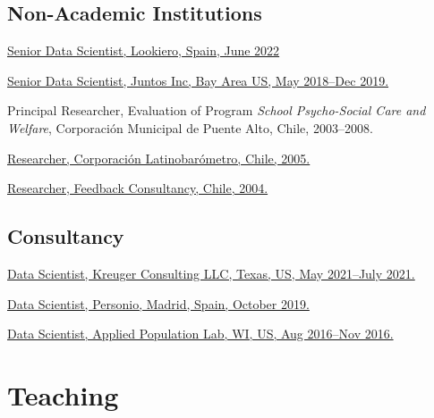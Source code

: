 \documentclass[10pt,letterpaper]{article}
\renewenvironment{itemize}{
  \begin{list}{}{
    \setlength{\leftmargin}{1.5em}
    \setlength{\itemsep}{0.25em}
    \setlength{\parskip}{0pt}
    \setlength{\parsep}{0.25em}
  }
}{
  \end{list}
}
\begin{document}


\subsection*{Non-Academic Institutions}

\begin{itemize}
\item \href{}{Senior Data Scientist, Lookiero, Spain, June 2022}
\item \href{http://juntosglobal.com/}{Senior Data Scientist, Juntos Inc, Bay Area US, May 2018--Dec 2019.}
\item Principal Researcher, Evaluation of Program \textit{School Psycho-Social Care and Welfare}, Corporación Municipal de Puente Alto, Chile, 2003--2008.
\item \href{http://www.latinobarometro.org}{Researcher, Corporación Latinobarómetro, Chile, 2005.}
\item \href{http://www.feedback.cl}{Researcher, Feedback Consultancy, Chile, 2004.}
\end{itemize}


\subsection*{Consultancy}

\begin{itemize}
\item \href{https://www.kreugerconsulting.com/}{Data Scientist, Kreuger Consulting LLC, Texas, US, May 2021--July 2021.}
\item \href{https://www.personio.es/}{Data Scientist, Personio, Madrid, Spain, October 2019.}
\item \href{https://apl.wisc.edu}{Data Scientist, Applied Population Lab, WI, US, Aug 2016--Nov 2016.}
\end{itemize}


\section*{Teaching}
\end{document}

